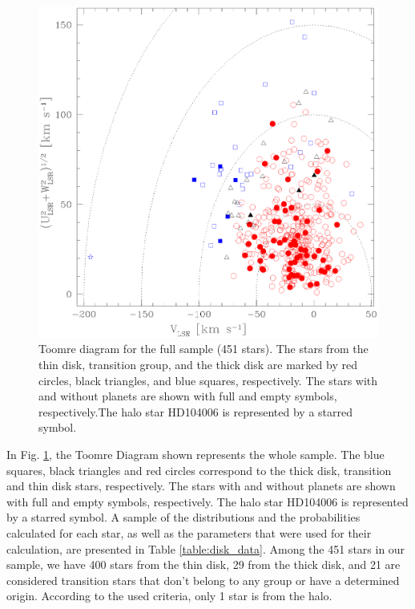 \documentclass[oldversion]{aa}
\begin{document}
\begin{figure}[t]
\centering
\includegraphics[width= 9 cm]{pics/tommrev2.eps}
\caption[]{Toomre diagram for the full sample (451 stars). The stars from the thin disk, transition group, and the thick disk are marked by red circles, black triangles, and blue squares, respectively. The stars with and without planets are shown with full and empty symbols, respectively.The halo star HD104006 is represented by a starred symbol.}
\label{fig:tommre}
\end{figure}

In Fig. \ref{fig:tommre}, the Toomre Diagram shown represents the whole sample. The blue squares, black triangles and red circles correspond to the thick disk, transition and thin disk stars, respectively. The stars with and without planets are shown with full and empty symbols, respectively. The halo star HD104006 is represented by a starred symbol. A sample of the distributions and the probabilities calculated for each star, as well as the parameters that were used for their calculation, are presented in Table \ref{table:disk_data}. Among the 451 stars in our sample, we have 400 stars from the thin disk, 29 from the thick disk, and 21 are considered transition stars that don't belong to any group or have a determined origin. According to the used criteria, only 1 star is from the halo.






\end{document}
